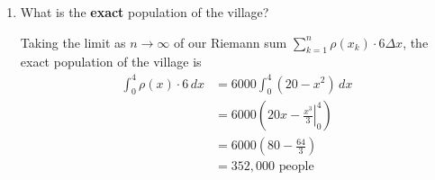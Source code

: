 \documentclass[main]{subfiles}
\begin{document}
\begin{enumerate}
\begin{enumerate}
  \item
    \begin{problem}[0.75in]
      What is the \textbf{exact} population of the village?
    \end{problem}

    \begin{solution}
      Taking the limit as $n \to \infty$ of our Riemann sum $\displaystyle
      \sum_{k=1}^n \rho(x_k) \cdot 6 \Delta x$, the exact population of
      the village is
      \begin{align*}
        \boxed{\int_0^4 \rho(x) \cdot 6\,dx} &= 6000 \int_0^4 (20 -
        x^2)\,dx \\
        &= 6000 \left( \left. 20 x - \frac{x^3}{3} \right|_0^4 \right) \\
        &= 6000 \left( 80 - \frac{64}{3} \right) \\
        &= \boxed{352,000 \text{ people}}
      \end{align*}
    \end{solution}

  \end{enumerate}

\end{enumerate}
\end{document}
